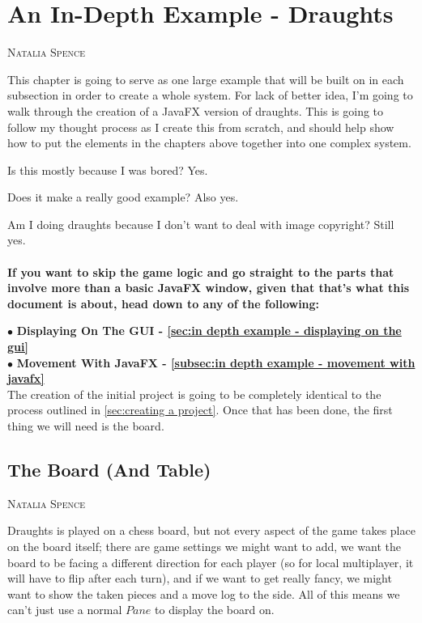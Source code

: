 \documentclass[a4paper]{report}
\makeatletter
\newcommand{\chapterauthor}[1]{%
	{\parindent0pt\vspace*{-25pt}%
		\linespread{1.1}\large\scshape#1%
		\par\nobreak\vspace*{25pt}}
	\@afterheading%
}
\newcommand{\sectionauthor}[1]{%
	{\parindent0pt\vspace*{0pt}%
		\linespread{1.1}\large\scshape#1%
		\par\nobreak\vspace*{10pt}}
	\@afterheading%
}
\makeatother
\begin{document}
	\chapter{An In-Depth Example - Draughts}\label{chap:an in depth example}
	\chapterauthor{Natalia Spence}
	
		This chapter is going to serve as one large example that will be built on in each subsection in order to create a whole system. For lack of better idea, I'm going to walk through the creation of a JavaFX version of draughts. This is going to follow my thought process as I create this from scratch, and should help show how to put the elements in the chapters above together into one complex system.
		
		Is this mostly because I was bored? Yes.
		
		Does it make a really good example? Also yes. 
		
		Am I doing draughts because I don't want to deal with image copyright? Still yes. \\ \\
		
		\textbf{If you want to skip the game logic and go straight to the parts that involve more than a basic JavaFX window, given that that's what this document is about, head down to any of the following:}
		
		$\bullet$ \textbf{Displaying On The GUI - \vref{sec:in depth example - displaying on the gui}} \\
		$\bullet$ \textbf{Movement With JavaFX - \vref{subsec:in depth example - movement with javafx}} \\
		
		The creation of the initial project is going to be completely identical to the process outlined in \vref{sec:creating a project}. Once that has been done, the first thing we will need is the board.
		
		\section{The Board (And Table)}\label{sec:in depth example - the board (and table)}
		\sectionauthor{Natalia Spence}
		
			Draughts is played on a chess board, but not every aspect of the game takes place on the board itself; there are game settings we might want to add, we want the board to be facing a different direction for each player (so for local multiplayer, it will have to flip after each turn), and if we want to get really fancy, we might want to show the taken pieces and a move log to the side. All of this means we can't just use a normal $Pane$ to display the board on.
			
\end{document}
